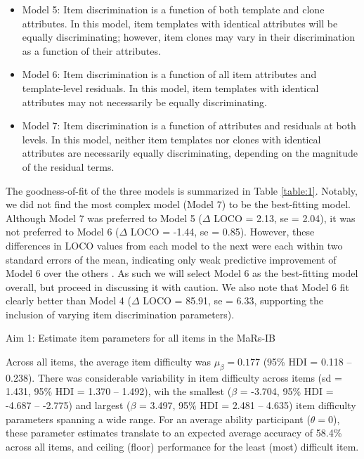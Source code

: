 \documentclass[a4paper,man,natbib]{apa6}
\makeatletter
\renewcommand{\subsubsection}{\@startsection{subsubsection}{3}
  {\z@}%
  {\b@level@two@skip}{\e@level@two@skip}%
  {\normalfont\normalsize\bfseries}}
\makeatother
\begin{document}
\begin{itemize}

    \item Model 5: Item discrimination is a function of both template and clone attributes. In this model, item templates with identical attributes will be equally discriminating; however, item clones may vary in their discrimination as a function of their attributes.
    
    \item Model 6: Item discrimination is a function of all item attributes and template-level residuals. In this model, item templates with identical attributes may not necessarily be equally discriminating.
    
    \item Model 7: Item discrimination is a function of attributes and residuals at both levels. In this model, neither item templates nor clones with identical attributes are necessarily equally discriminating, depending on the magnitude of the residual terms.
    
\end{itemize}

The goodness-of-fit of the three models is summarized in Table \ref{table:1}. Notably, we did not find the most complex model (Model 7) to be the best-fitting model. Although Model 7 was preferred to Model 5 ($\Delta$ LOCO = 2.13, se = 2.04), it was not preferred to Model 6 ($\Delta$ LOCO = -1.44, se = 0.85). However, these differences in LOCO values from each model to the next were each within two standard errors of the mean, indicating only weak predictive improvement of Model 6 over the others \citep{vehtari2022cv}. As such we will select Model 6 as the best-fitting model overall, but proceed in discussing it with caution. We also note that Model 6 fit clearly better than Model 4 ($\Delta$ LOCO = 85.91, se = 6.33, supporting the inclusion of varying item discrimination parameters).

\subsubsection{Aim 1: Estimate item parameters for all items in the MaRs-IB}

Across all items, the average item difficulty was $\mu_\beta = 0.177$ (95\% HDI = 0.118 -- 0.238). There was considerable variability in item difficulty across items (sd = 1.431, 95\% HDI = 1.370 -- 1.492), wih the smallest ($\beta$ = -3.704, 95\% HDI = -4.687 -- -2.775) and largest ($\beta$ = 3.497, 95\% HDI = 2.481 -- 4.635) item difficulty parameters spanning a wide range. For an average ability participant ($\theta = 0$), these parameter estimates translate to an expected average accuracy of 58.4\% across all items, and ceiling (floor) performance for the least (most) difficult item.
\end{document}
